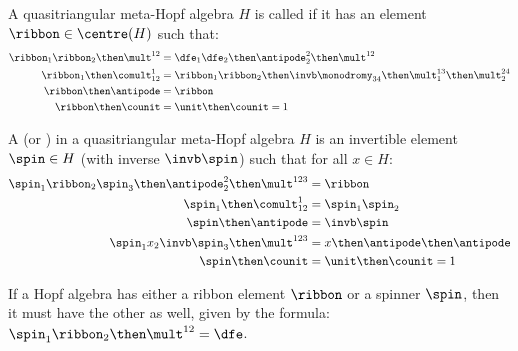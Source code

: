 \begin{definition}
        A quasitriangular meta-Hopf algebra $H$ is called  if it has an
        element $\ribbon\in \centre(H)$ such that:
        \begin{align}
                \ribbon_1\ribbon_2\then\mult^{12}
                &= \dfe_1 \dfe_2 \then \antipode^{2}_{2} \then \mult^{12}\\
                \ribbon_1 \then \comult^1_{12}
                &=      \ribbon_1\ribbon_2
                        \then\invb\monodromy_{34}
                        \then\mult^{13}_{1}
                        \then\mult^{24}_{2} \\
                \ribbon \then \antipode &= \ribbon\\
                \ribbon \then \counit &= \unit \then \counit = 1
        \end{align}
\end{definition}

\begin{definition}
        A  (or ) in a
        quasitriangular meta-Hopf algebra $H$ is an invertible element
        $\spin\in H$ (with inverse $\invb\spin$) such that for all $x\in H$:
        \begin{align}
                \label{eq:spinner_ribbon}
                \spin_1\ribbon_2\spin_3 \then \antipode^2_2 \then \mult^{123} &=
                \ribbon\\
                \label{eq:spinner_comult}
                \spin_1\then\comult^{1}_{12} &=\spin_1\spin_2\\
                \label{eq:spinner_antipode}
                \spin \then\antipode &= \invb\spin\\
                \label{eq:spinner_conjugate}
                \spin_{1}x_2\invb\spin_{3}\then\mult^{123} &=
                x \then \antipode \then \antipode\\
                \label{eq:spinner_counit}
                \spin \then \counit &= \unit \then \counit = 1
        \end{align}
\end{definition}

\begin{lemma}\label{lem:spinner_ribbon}
        If a Hopf algebra has either a ribbon element $\ribbon$ or a spinner
        $\spin$, then it must have the other as well, given by the formula:
        $\spin_1 \ribbon_2 \then \mult^{12} = \dfe$.
\end{lemma}

